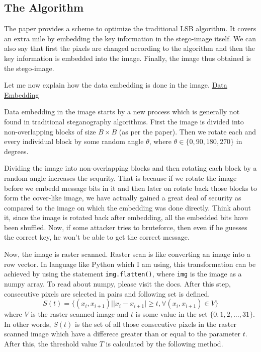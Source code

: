 \documentclass{report}
\begin{document}
\subsection{The Algorithm}
The paper provides a scheme to optimize the traditional LSB algorithm. It covers an extra mile by embedding the key information in the stego-image itself. We can also say that first the pixels are changed according to the algorithm and then the key information is embedded into the image. Finally, the image thus obtained is the stego-image. \par Let me now explain how the data embedding is done in the image.
\newpage
\underline{\large Data Embedding} \\
\par Data embedding in the image starts by a new process which is generally not found in traditional steganography algorithms. First the image is divided into non-overlapping blocks of size $B \times B$ (as per the paper). Then we rotate each and every individual block by some random angle $\theta$, where $\theta \in \{0, 90, 180, 270\}$ in degrees. \par Dividing the image into non-overlapping blocks and then rotating each block by a random angle increases the sequrity. That is because if we rotate the image before we embedd message bits in it and then later on rotate back those blocks to form the cover-like image, we have actually gained a great deal of security as compared to the image on which the embedding was done directly. Think about it, since the image is rotated back after embedding, all the embedded bits have been shuffled. Now, if some attacker tries to bruteforce, then even if he guesses the correct key, he won't be able to get the correct message. \par Now, the image is raster scanned. Raster scan is like converting an image into a row vector. In language like Python which I am using, this transformation can be achieved by using the statement \texttt{img.flatten()}, where \texttt{img} is the image as a numpy array. To read about numpy, please visit the docs. After this step, consecutive pixels are selected in pairs and following set is defined.
\begin{equation}
S(t) = \{(x_{i}, x_{i+1})| |x_{i} - x_{i+1}| \geq t, \forall (x_{i}, x_{i+1}) \in V \}
\end{equation}
where $V$ is the raster scanned image and $t$ is some value in the set $\{0, 1, 2, ..., 31 \}$. In other words, $S(t)$ is the set of all those consecutive pixels in the raster scanned image which have a differece greater than or equal to the parameter $t$. After this, the threshold value $T$ is calculated by the following method.
\end{document}
